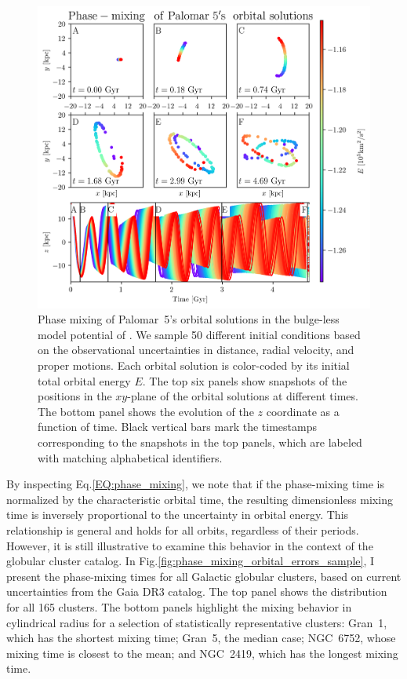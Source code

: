             \begin{figure}
                \centering
                \includegraphics[width=\linewidth]{images/phase_mixing_palomar_5_orbital_solutions.png}
                \caption{Phase mixing of Palomar~5's orbital solutions in the bulge-less model potential of \citet{2017A&A...598A..66P}. We sample 50 different initial conditions based on the observational uncertainties in distance, radial velocity, and proper motions. Each orbital solution is color-coded by its initial total orbital energy $E$. The top six panels show snapshots of the positions in the $xy$-plane of the orbital solutions at different times. The bottom panel shows the evolution of the $z$ coordinate as a function of time. Black vertical bars mark the timestamps corresponding to the snapshots in the top panels, which are labeled with matching alphabetical identifiers.}
                \label{fig:phase_mixing_palomar_5_orbital_solutions}
            \end{figure}
            By inspecting Eq.\ref{EQ:phase_mixing}, we note that if the phase-mixing time is normalized by the characteristic orbital time, the resulting dimensionless mixing time is inversely proportional to the uncertainty in orbital energy. This relationship is general and holds for all orbits, regardless of their periods. However, it is still illustrative to examine this behavior in the context of the globular cluster catalog. In Fig.\ref{fig:phase_mixing_orbital_errors_sample}, I present the phase-mixing times for all Galactic globular clusters, based on current uncertainties from the Gaia DR3 catalog. The top panel shows the distribution for all 165 clusters. The bottom panels highlight the mixing behavior in cylindrical radius for a selection of statistically representative clusters: Gran~1, which has the shortest mixing time; Gran~5, the median case; NGC~6752, whose mixing time is closest to the mean; and NGC~2419, which has the longest mixing time.

